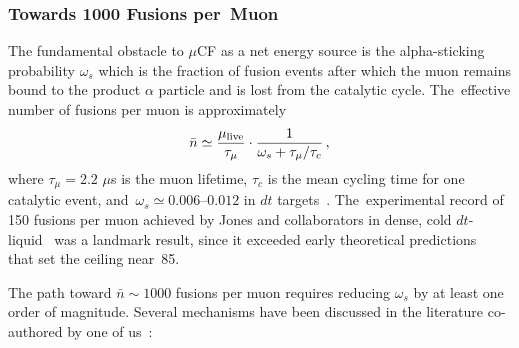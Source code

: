 \documentclass[particles,article,accept,pdftex,moreauthors]{Definitions/mdpi}
\begin{document}
\subsubsection{Towards 1000 Fusions per~Muon}\label{sssec:1000muCF}
The fundamental obstacle to $\mu$CF as a net energy source is the alpha-sticking probability $\omega_s$ which is the fraction of fusion events after which the muon remains bound to the product $\alpha$ particle and is lost from the catalytic cycle. The~effective number of fusions per muon is approximately
\begin{equation}
\bar{n} \simeq \frac{\mu_{\rm live}}{\tau_\mu} \cdot \frac{1}{\omega_s + \tau_\mu/\tau_c}\,,
\end{equation}
where $\tau_\mu = 2.2$ $\mu$s is the muon lifetime, $\tau_c$ is the mean cycling time for one catalytic event, and~$\omega_s \simeq 0.006$--$0.012$ in $dt$ targets~\cite{jones1993evaluation}. The~experimental record of 150 fusions per muon achieved by Jones and collaborators in dense, cold $dt$-liquid~\cite{Jones:1983pw,Jones:1986kk,Jones:1986Na} was a landmark result, since it exceeded early theoretical predictions~\cite{Jackson:2010Rem} that set the ceiling near~85.

The path toward $\bar{n}\sim 1000$ fusions per muon requires reducing $\omega_s$ by at least one order of magnitude. Several mechanisms have been discussed in the literature co-authored by one of us~\cite{Rafelski:1987Jones,Rafelski:1990gg,Rafelski:1990in}: 
\end{document}
